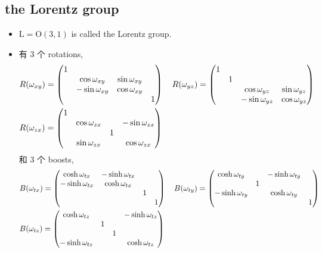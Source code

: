 \subsection{the Lorentz group}
\begin{itemize}
	\item $\mathrm{L} = \mathrm{O}(3, 1)$ is called the Lorentz group.
	
	\item 有 3 个 rotations,
	\begin{align}
		& R(\omega_{x y}) = \begin{pmatrix}
			1 & & & \\
			& \cos \omega_{x y} & \sin \omega_{x y} & \\
			& - \sin \omega_{x y} & \cos \omega_{x y} & \\
			& & & 1
		\end{pmatrix} \quad R(\omega_{y z}) = \begin{pmatrix}
			1 & & & \\
			& 1 & & \\
			& & \cos \omega_{y z} & \sin \omega_{y z} \\
			& & - \sin \omega_{y z} & \cos \omega_{y z}
		\end{pmatrix} \notag \\
		& R(\omega_{z x}) = \begin{pmatrix}
			1 & & & \\
			& \cos \omega_{z x} & & - \sin \omega_{z x} \\
			& & 1 & \\
			& \sin \omega_{z x} & & \cos \omega_{z x}
		\end{pmatrix}
	\end{align}
	和 3 个 boosts,
	\begin{align}
		& B(\omega_{t x}) = \begin{pmatrix}
			\cosh \omega_{t x} & - \sinh \omega_{t x} & & \\
			- \sinh \omega_{t x} & \cosh \omega_{t x} & & \\
			& & 1 & \\
			& & & 1
		\end{pmatrix} \quad B(\omega_{t y}) = \begin{pmatrix}
			\cosh \omega_{t y} & & - \sinh \omega_{t y} & \\
			& 1 & & \\
			- \sinh \omega_{t y} & & \cosh \omega_{t y} & \\
			& & & 1
		\end{pmatrix} \notag \\
		& B(\omega_{t z}) = \begin{pmatrix}
			\cosh \omega_{t z} & & & - \sinh \omega_{t z} \\
			& 1 & & \\
			& & 1 & \\
			- \sinh \omega_{t z} & & & \cosh \omega_{t z}
		\end{pmatrix}
	\end{align}
\end{itemize}

